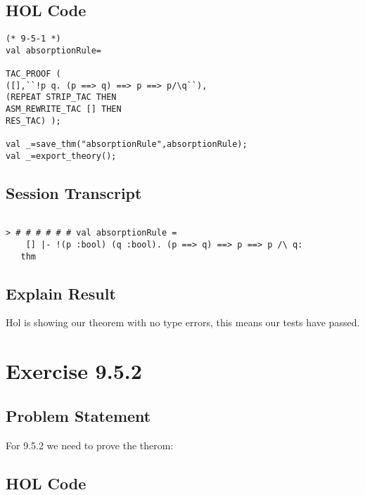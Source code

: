 \documentclass{report}
\begin{document}
\section{HOL Code}
\label{HOl Code 841}

\begin{lstlisting}[frame=trBL]
(* 9-5-1 *)
val absorptionRule=

TAC_PROOF (
([],``!p q. (p ==> q) ==> p ==> p/\q``),
(REPEAT STRIP_TAC THEN
ASM_REWRITE_TAC [] THEN
RES_TAC) );

val _=save_thm("absorptionRule",absorptionRule);
val _=export_theory();
\end{lstlisting}

\section{Session Transcript}
\label{Session Trans1}

\setcounter{sessioncount}{0}
\begin{session}
  \begin{scriptsize}
\begin{verbatim}

> # # # # # # val absorptionRule =
    [] |- !(p :bool) (q :bool). (p ==> q) ==> p ==> p /\ q:
   thm
\end{verbatim}
  \end{scriptsize}
\end{session}

\section{Explain Result}
\label{eplain re 951}
Hol is showing our theorem with no type errors, this means our tests have passed.


\chapter{Exercise 9.5.2}
\label{ex 952}

\section{Problem Statement}
\label{problem state 952}
For 9.5.2 we need to prove the therom:


\section{HOL Code}
\label{HOl Code 952}
\end{document}
